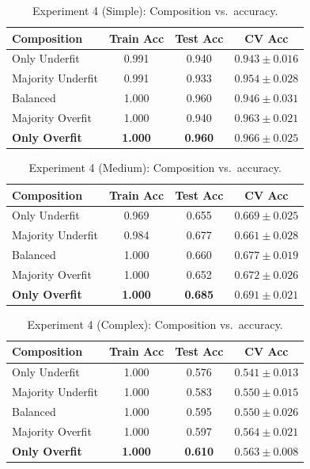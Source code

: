 \documentclass[conference]{IEEEtran}
\begin{document}
\begin{table}[h]
\centering
\caption{Experiment 4 (Simple): Composition vs.\ accuracy.}
\label{tab:exp4-simple}
\begin{tabular}{lccc}
\toprule
Composition & Train Acc & Test Acc & CV Acc \\
\midrule
Only Underfit      & 0.991 & 0.940 & $0.943 \pm 0.016$ \\
Majority Underfit  & 0.991 & 0.933 & $0.954 \pm 0.028$ \\
Balanced           & 1.000 & 0.960 & $0.946 \pm 0.031$ \\
Majority Overfit   & 1.000 & 0.940 & $0.963 \pm 0.021$ \\
\textbf{Only Overfit}      & \textbf{1.000} & \textbf{0.960} & $\mathbf{0.966 \pm 0.025}$ \\
\bottomrule
\end{tabular}
\end{table}

\begin{table}[h]
\centering
\caption{Experiment 4 (Medium): Composition vs.\ accuracy.}
\label{tab:exp4-medium}
\begin{tabular}{lccc}
\toprule
Composition & Train Acc & Test Acc & CV Acc \\
\midrule
Only Underfit      & 0.969 & 0.655 & $0.669 \pm 0.025$ \\
Majority Underfit  & 0.984 & 0.677 & $0.661 \pm 0.028$ \\
Balanced           & 1.000 & 0.660 & $0.677 \pm 0.019$ \\
Majority Overfit   & 1.000 & 0.652 & $0.672 \pm 0.026$ \\
	\textbf{Only Overfit}      & \textbf{1.000} & \textbf{0.685} & $\mathbf{0.691 \pm 0.021}$ \\
\bottomrule
\end{tabular}
\end{table}

\begin{table}[h]
\centering
\caption{Experiment 4 (Complex): Composition vs.\ accuracy.}
\label{tab:exp4-complex}
\begin{tabular}{lccc}
\toprule
Composition & Train Acc & Test Acc & CV Acc \\
\midrule
Only Underfit      & 1.000 & 0.576 & $0.541 \pm 0.013$ \\
Majority Underfit  & 1.000 & 0.583 & $0.550 \pm 0.015$ \\
Balanced           & 1.000 & 0.595 & $0.550 \pm 0.026$ \\
Majority Overfit   & 1.000 & 0.597 & $0.564 \pm 0.021$ \\
\textbf{Only Overfit}      & \textbf{1.000} & \textbf{0.610} & $\mathbf{0.563 \pm 0.008}$ \\
\bottomrule
\end{tabular}
\end{table}
\end{document}

